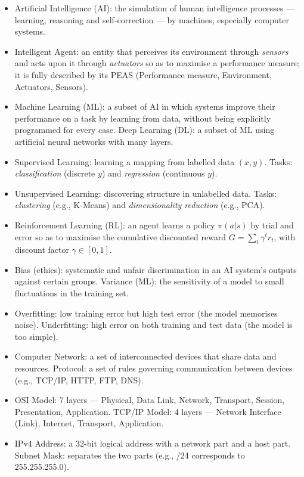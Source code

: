 \documentclass[11pt]{article}
\newcommand{\cle}[1]{{\popxbold\color{popdark}#1}}
\newcounter{popsec}
\newcounter{popsub}
\newcommand{\courssub}[1]{%
  \stepcounter{popsub}%
  \par\vspace{9pt}\noindent{\popxbold\fontsize{11.5}{13}\selectfont\color{popink}{\color{poporange}\thepopsec.\thepopsub}\hspace{6pt}#1}\par\nopagebreak\vspace{4pt}
}
\begin{document}
\courssub{Essential Summary (Bilan)}

\begin{aretenir}
\begin{itemize}
    \item \cle{Artificial Intelligence (AI)}: the simulation of human intelligence processes --- learning, reasoning and self-correction --- by machines, especially computer systems.
    \item \cle{Intelligent Agent}: an entity that perceives its environment through \emph{sensors} and acts upon it through \emph{actuators} so as to maximise a performance measure; it is fully described by its \cle{PEAS} (Performance measure, Environment, Actuators, Sensors).
    \item \cle{Machine Learning (ML)}: a subset of AI in which systems improve their performance on a task by learning from data, without being explicitly programmed for every case. \cle{Deep Learning (DL)}: a subset of ML using artificial neural networks with many layers.
    \item \cle{Supervised Learning}: learning a mapping from labelled data $(x, y)$. Tasks: \emph{classification} (discrete $y$) and \emph{regression} (continuous $y$).
    \item \cle{Unsupervised Learning}: discovering structure in unlabelled data. Tasks: \emph{clustering} (e.g., K-Means) and \emph{dimensionality reduction} (e.g., PCA).
    \item \cle{Reinforcement Learning (RL)}: an agent learns a policy $\pi(a|s)$ by trial and error so as to maximise the cumulative discounted reward $G = \sum_{t} \gamma^{t} r_{t}$, with discount factor $\gamma \in [0,1]$.
    \item \cle{Bias (ethics)}: systematic and unfair discrimination in an AI system's outputs against certain groups. \cle{Variance (ML)}: the sensitivity of a model to small fluctuations in the training set.
    \item \cle{Overfitting}: low training error but high test error (the model memorises noise). \cle{Underfitting}: high error on both training and test data (the model is too simple).
    \item \cle{Computer Network}: a set of interconnected devices that share data and resources. \cle{Protocol}: a set of rules governing communication between devices (e.g., TCP/IP, HTTP, FTP, DNS).
    \item \cle{OSI Model}: 7 layers --- Physical, Data Link, Network, Transport, Session, Presentation, Application. \cle{TCP/IP Model}: 4 layers --- Network Interface (Link), Internet, Transport, Application.
    \item \cle{IPv4 Address}: a 32-bit logical address with a network part and a host part. \cle{Subnet Mask}: separates the two parts (e.g., /24 corresponds to 255.255.255.0).
\end{itemize}
\end{aretenir}
\end{document}
